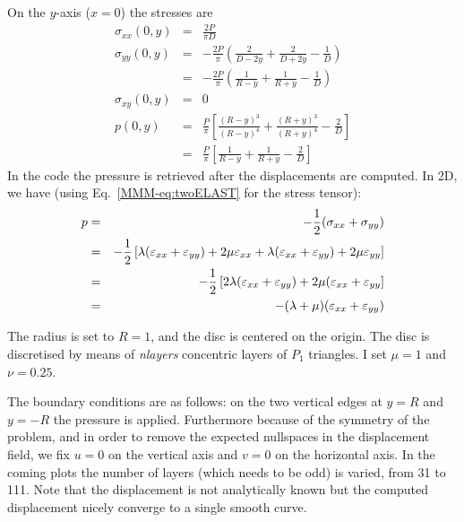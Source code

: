 On the $y$-axis ($x=0$) the stresses are 
\begin{eqnarray}
\sigma_{xx}(0,y) &=& \frac{2P}{\pi D} \\
\sigma_{yy}(0,y) 
&=& -\frac{2P}{\pi} \left( \frac{2}{D-2y} + \frac{2}{D+2y} -\frac{1}{D} \right) \\
&=& -\frac{2P}{\pi} \left( \frac{1}{R-y} + \frac{1}{R+y} -\frac{1}{D} \right) \\
\sigma_{xy} (0,y) &=& 0 \\
p(0,y) 
&=& \frac{P}{\pi} \left[ \frac{(R-y)^3 }{(R-y)^4} + \frac{ (R+y)^3  }{(R+y)^4}  - \frac{2}{D} \right] \\
&=& \frac{P}{\pi} \left[ \frac{1}{R-y} + \frac{ 1 }{R+y}  - \frac{2}{D} \right] 
\end{eqnarray}
In the code the pressure is retrieved after the displacements are computed. 
In 2D, we have (using Eq.~\ref{MMM-eq:twoELAST} for the stress tensor):
\begin{eqnarray}
p
&=& -\frac{1}{2}(\sigma_{xx} + \sigma_{yy}) \nonumber\\
&=& -\frac{1}{2} \left[
\lambda (\varepsilon_{xx}+\varepsilon_{yy}) + 2 \mu \varepsilon_{xx} +
\lambda (\varepsilon_{xx}+\varepsilon_{yy}) + 2 \mu \varepsilon_{yy} 
\right] \\
&=& -\frac{1}{2} \left[
2\lambda (\varepsilon_{xx}+\varepsilon_{yy}) + 2 \mu (\varepsilon_{xx} + \varepsilon_{yy} \right]\nonumber\\
&=& -(\lambda+\mu) (\varepsilon_{xx}+\varepsilon_{yy}) 
\end{eqnarray}

The radius is set to $R=1$, and the disc is centered on the origin. The disc 
is discretised by means of {\sl nlayers} concentric layers of $P_1$ triangles.
I set $\mu=1$ and $\nu=0.25$. 

The boundary conditions are as follows: on the two vertical edges at $y=R$ and $y=-R$ 
the pressure is applied. Furthermore because of the symmetry of the problem, 
and in order to remove the expected nullspaces in the displacement field, 
we fix $u=0$ on the vertical axis and $v=0$ on the horizontal axis.
In the coming plots the number of layers (which needs to be odd) is varied, from 31 to 111.
Note that the displacement is not analytically known but the computed displacement 
nicely converge to a single smooth curve.

